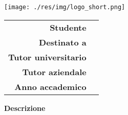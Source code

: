 \thispagestyle{empty}
\begin{titlepage}
	\begin{center}
		\vfill
        \large
		\texttt{[image: ./res/img/logo\_short.png]}
		\vfill
		\begin{Huge}
			\textbf{\docTitle}
		\end{Huge}
		\vfill
		\vspace*{\fill}
		\begin{tabular}{r|l}
			\textbf{Studente} & \red \\
			\textbf{Destinato a} & \destinatari \\
			\textbf{Tutor universitario} & \LDG \\
			\textbf{Tutor aziendale} & \NST \\
			\textbf{Anno accademico} & \annoAcc \\
		\end{tabular}	
		\normalsize
		\vfill
		\textbf{Descrizione}\\
		\textit{\desc} \\
		\vfill
	\end{center}
\end{titlepage}
